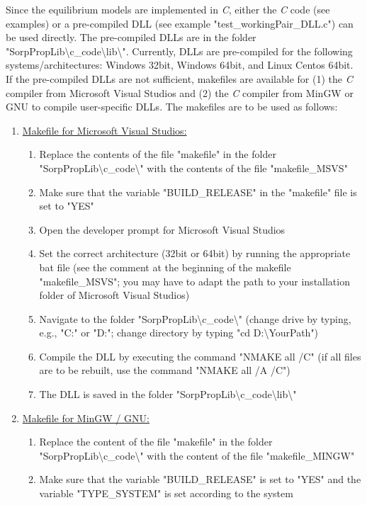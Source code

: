 Since the equilibrium models are implemented in \textit{C}, either the \textit{C} code (see examples) or a pre-compiled DLL (see example "test\_workingPair\_DLL.c") can be used directly. The pre-compiled DLLs are in the folder "SorpPropLib\textbackslash c\_code\textbackslash lib\textbackslash". Currently, DLLs are pre-compiled for the following systems/architectures: Windows 32bit, Windows 64bit, and Linux Centos 64bit. If the pre-compiled DLLs are not sufficient, makefiles are available for (1) the \textit{C} compiler from Microsoft Visual Studios and (2) the \textit{C} compiler from MinGW or GNU to compile user-specific DLLs. The makefiles are to be used as follows:
%
\begin{enumerate}
	\item \underline{Makefile for Microsoft Visual Studios:}
	\begin{enumerate}
		\item Replace the contents of the file "makefile" in the folder "SorpPropLib\textbackslash c\_code\textbackslash" with the contents of the file "makefile\_MSVS"
		\item Make sure that the variable "BUILD\_RELEASE" in the "makefile" file is set to "YES"
		\item Open the developer prompt for Microsoft Visual Studios
		\item Set the correct architecture (32bit or 64bit) by running the appropriate bat file (see the comment at the beginning of the makefile "makefile\_MSVS"; you may have to adapt the path to your installation folder of Microsoft Visual Studios)
		\item Navigate to the folder "SorpPropLib\textbackslash c\_code\textbackslash" (change drive by typing, e.g., "C:" or "D:"; change directory by typing "cd D:\textbackslash YourPath")
		\item Compile the DLL by executing the command "NMAKE all /C" (if all files are to be rebuilt, use the command "NMAKE all /A /C")
		\item The DLL is saved in the folder "SorpPropLib\textbackslash c\_code\textbackslash lib\textbackslash"
	\end{enumerate}
	\item \underline{Makefile for MinGW / GNU:}
	\begin{enumerate}
		\item Replace the content of the file "makefile" in the folder "SorpPropLib\textbackslash c\_code\textbackslash" with the content of the file "makefile\_MINGW"
		\item Make sure that the variable "BUILD\_RELEASE" is set to "YES" and the variable "TYPE\_SYSTEM" is set according to the system

\end{enumerate}
\end{enumerate}
